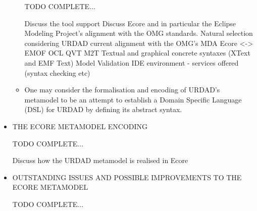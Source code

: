 \begin{itemize}
\begin{itemize}
		TODO COMPLETE...		

		Discuss the tool support
		Discuss Ecore and in particular the Eclipse Modeling Project's alignment with the OMG standards.
			Natural selection considering URDAD current alignment with the OMG's MDA
			Ecore <-> EMOF
			OCL
			QVT
		M2T
		Textual and graphical concrete syntaxes (XText and EMF Text)
		Model Validation
		IDE environment - services offered (syntax checking etc)
		
			\item One may consider the formalisation and encoding of URDAD's metamodel to be an attempt to establish a Domain Specific Language (DSL) for URDAD by defining its abstract syntax.
			
		\end{itemize}
	
	\item THE ECORE METAMODEL ENCODING 
	
	TODO COMPLETE...
	
	Discuss how the URDAD metamodel is realised in Ecore
		
	\item OUTSTANDING ISSUES AND POSSIBLE IMPROVEMENTS TO THE ECORE METAMODEL
	
	TODO COMPLETE...
		
\end{itemize}